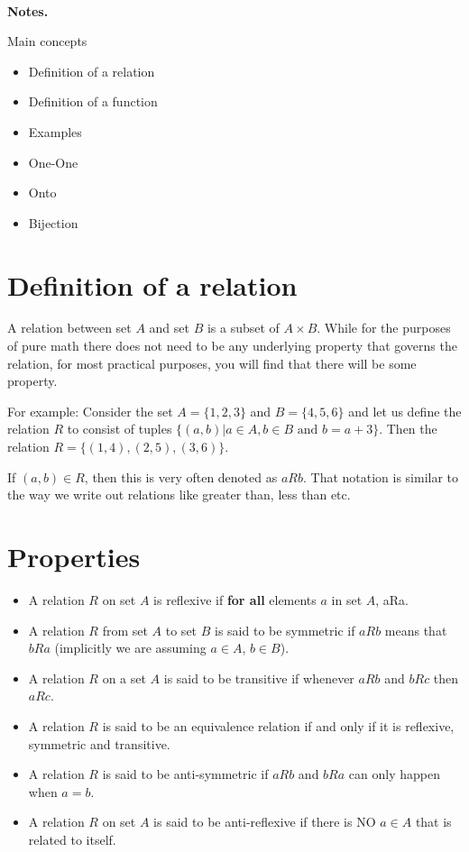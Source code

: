 \documentclass[12pt]{article}
\begin{document}
\begin{center}
\\
\vspace{1cm}
\end{center}


\medskip\noindent

{\bf Notes.}

Main concepts

\begin{itemize}
\item Definition of a relation
\item Definition of a function
\item Examples
\item One-One
\item Onto
\item Bijection
\end{itemize}

\vspace{0.5cm}\noindent

\section*{Definition of a relation}

A relation between set $A$ and set $B$ is a subset of $A \times B$. While for the purposes of pure math there does not need to be any underlying property that governs the relation, for most practical purposes, you will find that there will be some property.

For example: Consider the set $A = \{1,2,3\}$ and $B = \{4,5,6\}$ and let us define the relation $R$ to consist of tuples $\{(a,b)| a \in A, b \in B \text{ and } b = a + 3\}$.
Then the relation $R = \{(1,4) , (2,5), (3,6)\}$.

If $(a,b) \in R$, then this is very often denoted as $aRb$.
That notation is similar to the way we write out relations like greater than, less than etc.

\section*{Properties}

\begin{itemize}
\item A relation $R$ on set $A$ is reflexive if \textbf{for all} elements $a$ in set $A$, aRa. 
\item A relation $R$ from set $A$ to set $B$ is said to be symmetric if $aRb$ means that $bRa$ (implicitly we are assuming $a \in A$, $b \in B$).
\item A relation $R$ on a set $A$ is said to be transitive if whenever $aRb$ and $bRc$ then $aRc$. 
\item A relation $R$ is said to be an equivalence relation if and only if it is reflexive, symmetric and transitive.
\item A relation $R$ is said to be anti-symmetric if $aRb$ and $bRa$ can only happen when $a =b$.
\item A relation $R$ on set $A$ is said to be anti-reflexive if there is NO $a \in A$ that is related to itself. 
\end{itemize}
\end{document}
